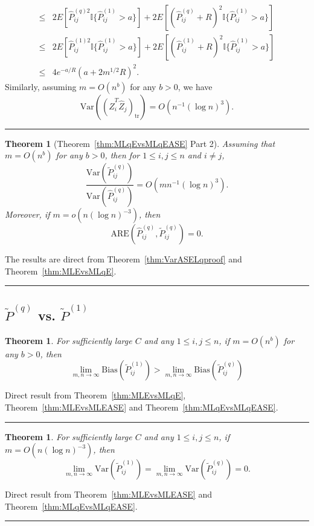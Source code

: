 \documentclass[a4paper]{article}
\newenvironment{proof}{{\bf Proof:  }}{\hfill\rule{2mm}{2mm}}
\newtheorem{theorem}[fact]{Theorem}
\renewcommand{\hat}{\widehat}
\begin{document}
\begin{proof}
\begin{align*}
	\le & 2 E[\hat{P}^{(q)2}_{ij} \mathbb{I}\{\hat{P}^{(1)}_{ij} > a\}] + 2 E[(\hat{P}^{(q)}_{ij} + R)^2 \mathbb{I}\{\hat{P}^{(1)}_{ij} > a\}] \\
	\le & 2 E[\hat{P}^{(1)2}_{ij} \mathbb{I}\{\hat{P}^{(1)}_{ij} > a\}] + 2 E[(\hat{P}^{(1)}_{ij} + R)^2 \mathbb{I}\{\hat{P}^{(1)}_{ij} > a\}] \\
	\le & 4 e^{-a/R} (a + 2 m^{1/2} R)^2.
\end{align*}
Similarly, assuming $m = O(n^b)$ for any $b > 0$, we have
\[
	\mathrm{Var}((\hat{Z}_i^T \hat{Z}_j)_{\mathrm{tr}})
	= O(n^{-1} (\log n)^3).
\]
\end{proof}

\begin{theorem}[Theorem~\ref{thm:MLqEvsMLqEASE} Part 2]
\label{thm:ARELqproof}
Assuming that $m = O(n^b)$ for any $b > 0$,  then for $1 \le i, j \le n$ and $i \ne j$,
\[
	\frac{\mathrm{Var}(\widetilde{P}_{ij}^{(q)})}{\mathrm{Var}(\hat{P}_{ij}^{(q)})}
    = O(m n^{-1} (\log n)^3).
\]
Moreover, if $m = o(n (\log n)^{-3})$, then
\[
	\mathrm{ARE}(\hat{P}_{ij}^{(q)}, \widetilde{P}_{ij}^{(q)}) = 0.
\]
\end{theorem}
\begin{proof}
The results are direct from Theorem~\ref{thm:VarASELqproof} and Theorem~\ref{thm:MLEvsMLqE}.
\end{proof}


\subsection{$\widetilde{P}^{(q)}$ vs. $\widetilde{P}^{(1)}$}
\label{section:MLqEASEvsMLEASE}
\begin{theorem}
\label{thm:biasL1andLq}
For sufficiently large $C$ and any $1 \le i,j \le n$, if $m = O(n^b)$ for any $b > 0$, then
\[
	\lim_{m, n \to \infty} \mathrm{Bias}(\widetilde{P}_{ij}^{(1)})
    > \lim_{m, n \to \infty} \mathrm{Bias}(\widetilde{P}_{ij}^{(q)})
\]
\end{theorem}
\begin{proof}
Direct result from Theorem~\ref{thm:MLEvsMLqE}, Theorem~\ref{thm:MLEvsMLEASE} and Theorem~\ref{thm:MLqEvsMLqEASE}.
\end{proof}

\begin{theorem}
\label{thm:varianceL1andLq}
For sufficiently large $C$ and any $1 \le i,j \le n$, if $m = O(n (\log n)^{-3})$, then
\[
	\lim_{m, n \to \infty} \mathrm{Var}(\widetilde{P}_{ij}^{(1)})
    = \lim_{m, n \to \infty} \mathrm{Var}(\widetilde{P}_{ij}^{(q)}) = 0.
\]
\end{theorem}
\begin{proof}
Direct result from Theorem~\ref{thm:MLEvsMLEASE} and Theorem~\ref{thm:MLqEvsMLqEASE}.
\end{proof}
\end{document}
